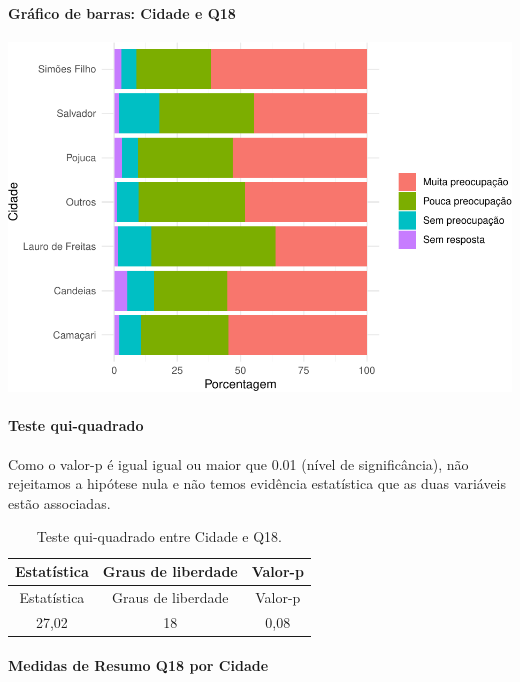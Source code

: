 \documentclass[]{article}
\let\oldparagraph\paragraph
\renewcommand{\paragraph}[1]{\oldparagraph{#1}\mbox{}}
\begin{document}
\hypertarget{gruxe1fico-de-barras-cidade-e-q18}{%
\paragraph{Gráfico de barras: Cidade e Q18}\label{gruxe1fico-de-barras-cidade-e-q18}}

\begin{center}\includegraphics[width=0.75\linewidth]{relatorio_covid19_files/figure-latex/unnamed-chunk-249-1} \end{center}

\hypertarget{teste-qui-quadrado-22}{%
\paragraph{Teste qui-quadrado}\label{teste-qui-quadrado-22}}

Como o valor-p é igual igual ou maior que 0.01 (nível de significância), não rejeitamos a hipótese nula e não temos evidência estatística que as duas variáveis estão associadas.

\begin{longtable}[]{@{}ccc@{}}
\caption{\label{tab:unnamed-chunk-251}Teste qui-quadrado entre Cidade e Q18.}\tabularnewline
\toprule
Estatística & Graus de liberdade & Valor-p\tabularnewline
\midrule
\endfirsthead
\toprule
Estatística & Graus de liberdade & Valor-p\tabularnewline
\midrule
\endhead
27,02 & 18 & 0,08\tabularnewline
\bottomrule
\end{longtable}

\cleardoublepage

\hypertarget{medidas-de-resumo-q18-por-cidade}{%
\paragraph{Medidas de Resumo Q18 por Cidade}\label{medidas-de-resumo-q18-por-cidade}}
\end{document}
